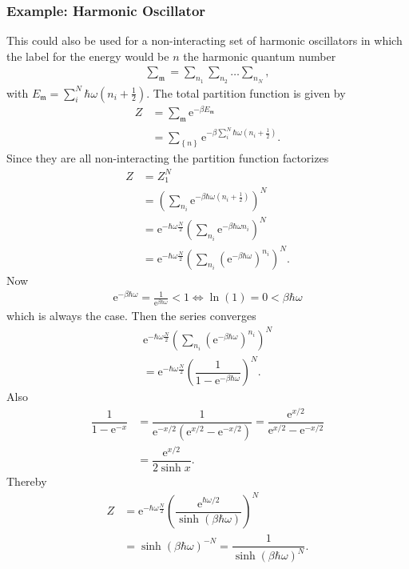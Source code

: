 \documentclass[a4paper,10pt]{article}
\numberwithin{equation}{section}
\begin{document}
\begin{multicols}{2}
\subsubsection{Example: Harmonic Oscillator}
This could also be used for a non-interacting set of harmonic oscillators in which the label for the energy would be $n$ the harmonic quantum number
\begin{align} 
  \sum_{\mathfrak{m}}^{}=\sum_{n_1}^{}\sum_{n_2}^{}\hdots \sum_{n_N}^{}
,\end{align} 
with $E_\mathfrak{m}=\sum_{i}^{N}\hbar \omega \left(n_i+\tfrac{1}{2}\right)$.
The total partition function is given by
\begin{align} 
  Z &= \sum_{\mathfrak{m}}^{}\text{e}^{-\beta E_\mathfrak{m}}\\
    &= \sum_{ \left\{n\right\}}^{}\text{e}^{-\beta \sum_{i}^{N}\hbar \omega (n_i+\tfrac{1}{2})}
.\end{align} 
Since they are all non-interacting the partition function factorizes
\begin{align} 
  Z &= Z_1^N\\
    &= \left(\sum_{n_i}^{}\text{e}^{-\beta \hbar \omega \left(n_i+\tfrac{1}{2}\right)}\right)^N\\
    &= \text{e}^{-\hbar \omega \tfrac{N}{2}}\left(\sum_{n_i}^{}\text{e}^{-\beta \hbar \omega n_i}\right)^N\\
    &= \text{e}^{-\hbar \omega \tfrac{N}{2}}\left(\sum_{n_i}^{}\left(\text{e}^{-\beta \hbar \omega }\right)^{n_i}\right)^N
.\end{align} 
Now 
\begin{align} 
  \text{e}^{-\beta \hbar \omega }=\tfrac{1}{\text{e}^{\beta \hbar \omega }}<1 \Leftrightarrow \ln(1)=0<\beta \hbar \omega 
\end{align} 
which is always the case.
Then the series converges
\begin{multline} 
    \text{e}^{-\hbar \omega \tfrac{N}{2}}\left(\sum_{n_i}^{}\left(\text{e}^{-\beta \hbar \omega }\right)^{n_i}\right)^N \\= \text{e}^{-\hbar \omega \tfrac{N}{2}}\left(\dfrac{1}{1-\text{e}^{-\beta \hbar \omega }}\right)^N
.\end{multline} 
Also
\begin{align} 
  \dfrac{1}{1-\text{e}^{-x}} &= \dfrac{1}{\text{e}^{-x/2}\left(\text{e}^{x/2}-\text{e}^{-x/2}\right)}=\dfrac{\text{e}^{x/2}}{\text{e}^{x/2}-\text{e}^{-x/2}}\\
                             &= \dfrac{\text{e}^{x/2}}{2\sinh x}
.\end{align} 
Thereby
\begin{align} 
  Z &= \text{e}^{-\hbar \omega \tfrac{N}{2}}\left(\dfrac{\text{e}^{\hbar \omega /2}}{\sinh \left(\beta \hbar \omega \right)}\right)^N\\
    &= \sinh \left(\beta \hbar \omega \right)^{-N}=\dfrac{1}{\sinh \left(\beta \hbar \omega \right)^N}
.\end{align} 


\end{multicols}
\end{document}
